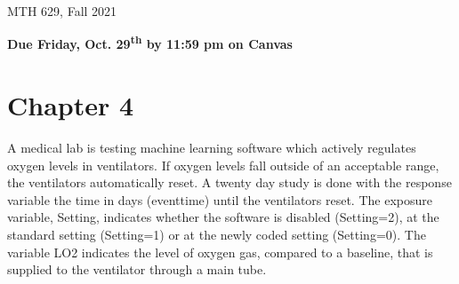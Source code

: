 \documentclass[12pt]{article}
\begin{document}
{
            \hfill {MTH 629, Fall 2021}}
\bigskip

{\bf Due Friday, Oct. 29\textsuperscript{th} by 11:59 pm on Canvas}

\section{Chapter 4}
\vspace{5pt}

A medical lab is testing machine learning software which actively regulates oxygen levels in ventilators. If oxygen levels fall outside of an acceptable range, the ventilators automatically reset. A twenty day study is done with the response variable the time in days (eventtime) until the ventilators reset. The exposure variable, Setting, indicates whether the software is disabled (Setting=2), at the standard setting (Setting=1) or at the newly coded setting (Setting=0). The variable LO2 indicates the level of oxygen gas, compared to a baseline, that is supplied to the ventilator through a main tube. 
\\
\end{document}
